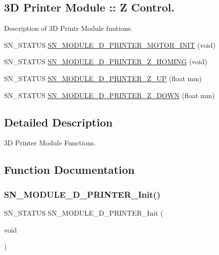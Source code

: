 \subsection*{3D Printer Module \+:\+: Z Control.}
\label{_amgrp0b5aafc53c5099dcb4016e710d2ae272}%
Description of 3D Printr Module funtions. \begin{DoxyCompactItemize}
\item 
S\+N\+\_\+\+S\+T\+A\+T\+US \hyperlink{group__PRINTER_gafc569784fa8758bec7c2f90b1a7f1404}{S\+N\+\_\+\+M\+O\+D\+U\+L\+E\+\_\+D\+\_\+\+P\+R\+I\+N\+T\+E\+R\+\_\+\+M\+O\+T\+O\+R\+\_\+\+I\+N\+IT} (void)
\item 
S\+N\+\_\+\+S\+T\+A\+T\+US \hyperlink{group__PRINTER_gafa7b9a2a41989695e1b881b984794432}{S\+N\+\_\+\+M\+O\+D\+U\+L\+E\+\_\+D\+\_\+\+P\+R\+I\+N\+T\+E\+R\+\_\+\+Z\+\_\+\+H\+O\+M\+I\+NG} (void)
\item 
S\+N\+\_\+\+S\+T\+A\+T\+US \hyperlink{group__PRINTER_ga4671a91d49ef53f67f1d203f18355c63}{S\+N\+\_\+\+M\+O\+D\+U\+L\+E\+\_\+D\+\_\+\+P\+R\+I\+N\+T\+E\+R\+\_\+\+Z\+\_\+\+UP} (float mm)
\item 
S\+N\+\_\+\+S\+T\+A\+T\+US \hyperlink{group__PRINTER_ga5747a0d753cb9d79747db6f4a22b18e9}{S\+N\+\_\+\+M\+O\+D\+U\+L\+E\+\_\+D\+\_\+\+P\+R\+I\+N\+T\+E\+R\+\_\+\+Z\+\_\+\+D\+O\+WN} (float mm)
\end{DoxyCompactItemize}


\subsection{Detailed Description}
3D Printer Module Functions. 



\subsection{Function Documentation}
\mbox{\label{group__PRINTER_ga801e265ffe6f8c56081112f4fdd35f39}} 
\subsubsection{\texorpdfstring{S\+N\+\_\+\+M\+O\+D\+U\+L\+E\+\_\+D\+\_\+\+P\+R\+I\+N\+T\+E\+R\+\_\+\+Init()}{SN\_MODULE\_3D\_PRINTER\_Init()}}
{\footnotesize\ttfamily S\+N\+\_\+\+S\+T\+A\+T\+US S\+N\+\_\+\+M\+O\+D\+U\+L\+E\+\_\+D\+\_\+\+P\+R\+I\+N\+T\+E\+R\+\_\+\+Init (\begin{DoxyParamCaption}\item[{void}]{ }\end{DoxyParamCaption})}



